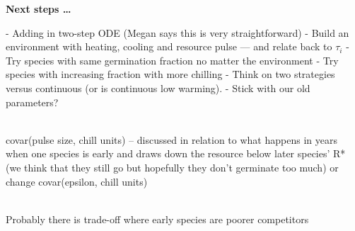 \documentclass[11pt,letter]{article}
\begin{document}
{\bf Next steps …}

- Adding in two-step ODE (Megan says this is very straightforward)
- Build an environment with heating, cooling and resource pulse — and relate back to $\tau_i$
	- Try species with same germination fraction no matter the environment
	- Try species with increasing fraction with more chilling 
- Think on two strategies versus continuous (or is continuous low warming).
- Stick with our old parameters? 

\\
covar(pulse size, chill units) -- discussed in relation to what happens in years when one species is early and draws down the resource below later species' R* (we think that they still go but hopefully they don't germinate too much) or change covar(epsilon, chill units)

\\
Probably there is trade-off where early species are poorer competitors
\end{document}
